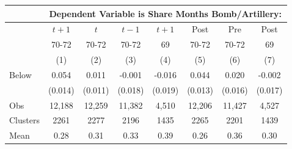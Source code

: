\begin{tabular}{lccccccc}
\hline  & \multicolumn{7}{c}{Dependent Variable is Share Months Bomb/Artillery:}\\
\hline  & $ t+1$ & $ t$ & $ t-1$ & $ t+1$ & Post & Pre & Post\\
 & 70-72 & 70-72 & 70-72 & 69 & 70-72 & 70-72 & 69\\
 & (1) & (2) & (3) & (4) & (5) & (6) & (7)\\
\hline Below & 0.054 & 0.011 & -0.001 & -0.016 & 0.044 & 0.020 & -0.002\\
 & (0.014) & (0.011) & (0.018) & (0.019) & (0.013) & (0.016) & (0.017)\\
Obs & 12,188 & 12,259 & 11,382 & 4,510 & 12,206 & 11,427 & 4,527\\
Clusters & 2261  & 2277  & 2196  & 1435  & 2265  & 2201  & 1439 \\
Mean & 0.28 & 0.31 & 0.33 & 0.39 & 0.26 & 0.36 & 0.30\\
\hline\end{tabular}\\
